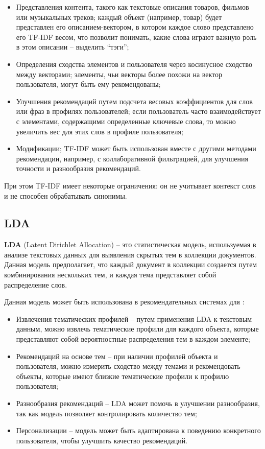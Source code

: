 \begin{itemize}
	\item Представления контента, такого как текстовые описания товаров, фильмов или музыкальных треков; каждый объект (например, товар) будет представлен его описанием-вектором, в котором каждое слово представлено его TF-IDF весом, что позволит понимать, какие слова играют важную роль в этом описании -- выделить ``тэги'';
	\item Определения сходства элементов и пользователя через косинусное сходство между векторами; элементы, чьи векторы более похожи на вектор пользователя, могут быть ему рекомендованы;
	\item Улучшения рекомендаций путем подсчета весовых коэффициентов для слов или фраз в профилях пользователей; если пользователь часто взаимодействует с элементами, содержащими определенные ключевые слова, то можно увеличить вес для этих слов в профиле пользователя;
	\item Модификации; TF-IDF может быть использован вместе с другими методами рекомендации, например, с коллаборативной фильтрацией, для улучшения точности и разнообразия рекомендаций.
\end{itemize}

При этом TF-IDF имеет некоторые ограничения: он не учитывает контекст слов и не способен обрабатывать синонимы. \cite{tfidf}

\subsection{LDA}

\textbf{LDA} (Latent Dirichlet Allocation) -- это статистическая модель, используемая в анализе текстовых данных для выявления скрытых тем в коллекции документов. Данная модель предполагает, что каждый документ в коллекции создается путем комбинирования нескольких тем, и каждая тема представляет собой распределение слов. \cite{lda}

Данная модель может быть использована в рекомендательных системах для \cite{lda}:

\begin{itemize}
	\item Извлечения тематических профилей -- путем применения LDA к текстовым данным, можно извлечь тематические профили для каждого объекта, которые представляют собой вероятностные распределения тем в каждом элементе;
	\item Рекомендаций на основе тем -- при наличии профилей объекта и пользователя, можно измерить сходство между темами и рекомендовать объекты, которые имеют близкие тематические профили к профилю пользователя;
	\item Разнообразия рекомендаций -- LDA может помочь в улучшении разнообразия, так как модель позволяет контролировать количество тем;
	\item Персонализации -- модель может быть адаптирована к поведению конкретного пользователя, чтобы улучшить качество рекомендаций.
\end{itemize}

